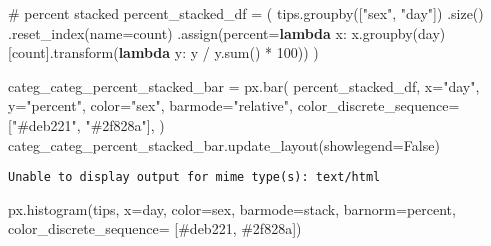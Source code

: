 \documentclass[
  letterpaper,
  DIV=11,
  numbers=noendperiod]{scrreprt}
\newenvironment{Shaded}{\begin{snugshade}}{\end{snugshade}}
\newcommand{\BuiltInTok}[1]{\textcolor[rgb]{0.00,0.23,0.31}{#1}}
\newcommand{\CommentTok}[1]{\textcolor[rgb]{0.37,0.37,0.37}{#1}}
\newcommand{\DecValTok}[1]{\textcolor[rgb]{0.68,0.00,0.00}{#1}}
\newcommand{\KeywordTok}[1]{\textcolor[rgb]{0.00,0.23,0.31}{\textbf{#1}}}
\newcommand{\NormalTok}[1]{\textcolor[rgb]{0.00,0.23,0.31}{#1}}
\newcommand{\OperatorTok}[1]{\textcolor[rgb]{0.37,0.37,0.37}{#1}}
\newcommand{\StringTok}[1]{\textcolor[rgb]{0.13,0.47,0.30}{#1}}
\newcommand{\VariableTok}[1]{\textcolor[rgb]{0.07,0.07,0.07}{#1}}
\begin{document}
\begin{Shaded}
\begin{Highlighting}[]
\CommentTok{\# percent stacked}
\NormalTok{percent\_stacked\_df }\OperatorTok{=}\NormalTok{ (}
\NormalTok{    tips.groupby([}\StringTok{"sex"}\NormalTok{, }\StringTok{"day"}\NormalTok{])}
\NormalTok{    .size()}
\NormalTok{    .reset\_index(name}\OperatorTok{=}\StringTok{\textquotesingle{}count\textquotesingle{}}\NormalTok{)}
\NormalTok{    .assign(percent}\OperatorTok{=}\KeywordTok{lambda}\NormalTok{ x: x.groupby(}\StringTok{\textquotesingle{}day\textquotesingle{}}\NormalTok{)[}\StringTok{\textquotesingle{}count\textquotesingle{}}\NormalTok{].transform(}\KeywordTok{lambda}\NormalTok{ y: y }\OperatorTok{/}\NormalTok{ y.}\BuiltInTok{sum}\NormalTok{() }\OperatorTok{*} \DecValTok{100}\NormalTok{))}
\NormalTok{)}

\NormalTok{categ\_categ\_percent\_stacked\_bar }\OperatorTok{=}\NormalTok{ px.bar(}
\NormalTok{    percent\_stacked\_df,}
\NormalTok{    x}\OperatorTok{=}\StringTok{"day"}\NormalTok{,}
\NormalTok{    y}\OperatorTok{=}\StringTok{"percent"}\NormalTok{,}
\NormalTok{    color}\OperatorTok{=}\StringTok{"sex"}\NormalTok{,}
\NormalTok{    barmode}\OperatorTok{=}\StringTok{"relative"}\NormalTok{,}
\NormalTok{    color\_discrete\_sequence}\OperatorTok{=}\NormalTok{[}\StringTok{"\#deb221"}\NormalTok{, }\StringTok{"\#2f828a"}\NormalTok{],}
\NormalTok{)}
\NormalTok{categ\_categ\_percent\_stacked\_bar.update\_layout(showlegend}\OperatorTok{=}\VariableTok{False}\NormalTok{)}
\end{Highlighting}
\end{Shaded}

\begin{verbatim}
Unable to display output for mime type(s): text/html
\end{verbatim}

\begin{Shaded}
\begin{Highlighting}[]
\NormalTok{px.histogram(tips, x}\OperatorTok{=}\StringTok{\textquotesingle{}day\textquotesingle{}}\NormalTok{, color}\OperatorTok{=}\StringTok{\textquotesingle{}sex\textquotesingle{}}\NormalTok{, barmode}\OperatorTok{=}\StringTok{\textquotesingle{}stack\textquotesingle{}}\NormalTok{, barnorm}\OperatorTok{=}\StringTok{\textquotesingle{}percent\textquotesingle{}}\NormalTok{, color\_discrete\_sequence}\OperatorTok{=}\NormalTok{ [}\StringTok{\textquotesingle{}\#deb221\textquotesingle{}}\NormalTok{, }\StringTok{\textquotesingle{}\#2f828a\textquotesingle{}}\NormalTok{])}
\end{Highlighting}
\end{Shaded}
\end{document}
